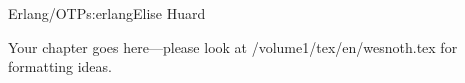 \begin{aosachapter}{Erlang/OTP}{s:erlang}{Elise Huard}

Your chapter goes here---please look at /volume1/tex/en/wesnoth.tex for 
formatting ideas.

\end{aosachapter}
